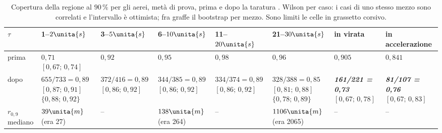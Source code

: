 \begin{table}[H]\centering\footnotesize
\caption{Copertura della regione al $90\,\%$ per gli aerei, metà di prova, prima e dopo la taratura . Wilson per caso: i casi di uno stesso mezzo sono correlati e l'intervallo è ottimista; fra graffe il bootstrap per mezzo. Sono limiti le celle in grassetto corsivo.}\label{tab:vo-taratura}
\setlength{\tabcolsep}{3pt}
\begin{tabularx}{\linewidth}{@{}>{\RaggedRight\arraybackslash}p{2.0cm}LLLLLLL@{}}
\toprule
$\tau$ & 1--$2\unita{s}$ & 3--$5\unita{s}$ & 6--$10\unita{s}$ & 11--$20\unita{s}$ & 21--$30\unita{s}$ & in virata & in accelerazione\\
\midrule
prima & $0{,}71$ $[0{,}67;\,0{,}74]$ & $0{,}92$ & $0{,}95$ & $0{,}98$ & $0{,}96$ & $0{,}905$ & $0{,}841$\\
dopo & $655/733=0{,}89$ $[0{,}87;\,0{,}91]$ $\{0{,}88;\,0{,}92\}$ & $372/416=0{,}89$ $[0{,}86;\,0{,}92]$ & $344/385=0{,}89$ $[0{,}86;\,0{,}92]$ & $334/374=0{,}89$ $[0{,}86;\,0{,}92]$ & $328/388=0{,}85$ $[0{,}81;\,0{,}88]$ $\{0{,}78;\,0{,}89\}$ & \textbf{\emph{161/221 = 0,73}} $[0{,}67;\,0{,}78]$ & \textbf{\emph{81/107 = 0,76}} $[0{,}67;\,0{,}83]$\\
$r_{0,9}$ mediano & $39\unita{m}$ (era 27) & -- & $138\unita{m}$ (era 264) & -- & $1106\unita{m}$ (era 2065) & -- & --\\
\bottomrule
\end{tabularx}
\end{table}


